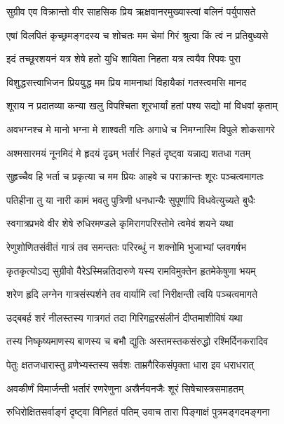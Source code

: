 \twolineshloka
{सुग्रीव एव विक्रान्तो वीर साहसिक प्रिय}
{ऋक्षवानरमुख्यास्त्वां बलिनं पर्युपासते} %

\twolineshloka
{एषां विलपितं कृच्छ्रमङ्गदस्य च शोचतः}
{मम चेमां गिरं श्रुत्वा किं त्वं न प्रतिबुध्यसे} %

\twolineshloka
{इदं तच्छूरशयनं यत्र शेषे हतो युधि}
{शायिता निहता यत्र त्वयैव रिपवः पुरा} %

\twolineshloka
{विशुद्धसत्त्वाभिजन प्रिययुद्ध मम प्रिय}
{मामनाथां विहायैकां गतस्त्वमसि मानद} %

\twolineshloka
{शूराय न प्रदातव्या कन्या खलु विपश्चिता}
{शूरभार्यां हतां पश्य सद्यो मां विधवां कृताम्} %

\twolineshloka
{अवभग्नश्च मे मानो भग्ना मे शाश्वती गतिः}
{अगाधे च निमग्नास्मि विपुले शोकसागरे} %

\twolineshloka
{अश्मसारमयं नूनमिदं मे हृदयं दृढम्}
{भर्तारं निहतं दृष्ट्वा यन्नाद्य शतधा गतम्} %

\twolineshloka
{सुहृच्चैव हि भर्ता च प्रकृत्या च मम प्रियः}
{आहवे च पराक्रान्तः शूरः पञ्चत्वमागतः} %

\twolineshloka
{पतिहीना तु या नारी कामं भवतु पुत्रिणी}
{धनधान्यैः सुपूर्णापि विधवेत्युच्यते बुधैः} %

\twolineshloka
{स्वगात्रप्रभवे वीर शेषे रुधिरमण्डले}
{कृमिरागपरिस्तोमे त्वमेवं शयने यथा} %

\twolineshloka
{रेणुशोणितसंवीतं गात्रं तव समन्ततः}
{परिरब्धुं न शक्नोमि भुजाभ्यां प्लवगर्षभ} %

\twolineshloka
{कृतकृत्योऽद्य सुग्रीवो वैरेऽस्मिन्नतिदारुणे}
{यस्य रामविमुक्तेन हृतमेकेषुणा भयम्} %

\twolineshloka
{शरेण हृदि लग्नेन गात्रसंस्पर्शने तव}
{वार्यामि त्वां निरीक्षन्ती त्वयि पञ्चत्वमागते} %

\twolineshloka
{उद्बबर्ह शरं नीलस्तस्य गात्रगतं तदा}
{गिरिगह्वरसंलीनं दीप्तमाशीविषं यथा} %

\twolineshloka
{तस्य निष्कृष्यमाणस्य बाणस्य च बभौ द्युतिः}
{अस्तमस्तकसंरुद्धो रश्मिर्दिनकरादिव} %

\twolineshloka
{पेतुः क्षतजधारास्तु व्रणेभ्यस्तस्य सर्वशः}
{ताम्रगैरिकसंपृक्ता धारा इव धराधरात्} %

\twolineshloka
{अवकीर्णं विमार्जन्ती भर्तारं रणरेणुना}
{अस्रैर्नयनजैः शूरं सिषेचास्त्रसमाहतम्} %

\twolineshloka
{रुधिरोक्षितसर्वाङ्गं दृष्ट्वा विनिहतं पतिम्}
{उवाच तारा पिङ्गाक्षं पुत्रमङ्गदमङ्गना} %

